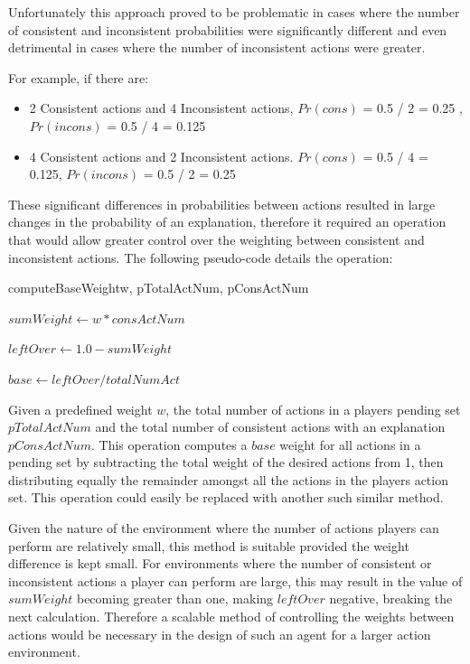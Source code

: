 \documentclass[parskip]{cs4rep}
\begin{document}
Unfortunately this approach proved to be problematic in cases where the number of consistent and inconsistent probabilities were significantly different and even detrimental in cases where the number of inconsistent actions were greater. 

For example, if there are:

\begin{itemize}
\item
2 Consistent actions and 4 Inconsistent actions, $Pr(cons)$ = 0.5 / 2 = 0.25 , $Pr(incons)$ = 0.5 / 4 = 0.125 
\item
4 Consistent actions and 2 Inconsistent actions. $Pr(cons)$ = 0.5 / 4 = 0.125, $Pr(incons)$ = 0.5 / 2 = 0.25
\end{itemize}

These significant differences in probabilities between actions resulted in large changes in the probability of an explanation, therefore it required an operation that would allow greater control over the weighting between consistent and inconsistent actions. The following pseudo-code details the operation:

\begin{pseudocode}[ruled]{computeBaseWeight}{w, pTotalActNum, pConsActNum}
\begin{algorithm}[H]

$sumWeight \gets w * consActNum$

$leftOver \gets 1.0 - sumWeight$

$base \gets leftOver / totalNumAct$

\end{algorithm}
\end{pseudocode}

Given a predefined weight $w$, the total number of actions in a players pending set $pTotalActNum$ and the total number of consistent actions with an explanation $pConsActNum$. This operation computes a $base$ weight for all actions in a pending set by subtracting the total weight of the desired actions from 1, then distributing equally the remainder amongst all the actions in the players action set. This operation could easily be replaced with another such similar method.

Given the nature of the environment where the number of actions players can perform are relatively small, this method is suitable provided the weight difference is kept small. For environments where the number of consistent or inconsistent actions a player can perform are large, this may result in the value of $sumWeight$ becoming greater than one, making $leftOver$ negative, breaking the next calculation. Therefore a scalable method of controlling the weights between actions would be necessary in the design of such an agent for a larger action environment.
\end{document}
